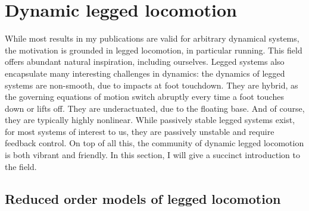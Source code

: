 \section{Dynamic legged locomotion}
While most results in my publications are valid for arbitrary dynamical systems, the motivation is grounded in legged locomotion, in particular running. This field offers abundant natural inspiration, including ourselves. Legged systems also encapsulate many interesting challenges in dynamics: the dynamics of legged systems are non-smooth, due to impacts at foot touchdown. They are hybrid, as the governing equations of motion switch abruptly every time a foot touches down or lifts off. They are underactuated, due to the floating base. And of course, they are typically highly nonlinear. While passively stable legged systems exist, for most systems of interest to us, they are passively unstable and require feedback control.
On top of all this, the community of dynamic legged locomotion is both vibrant and friendly. In this section, I will give a succinct introduction to the field.

\subsection{Reduced order models of legged locomotion}

